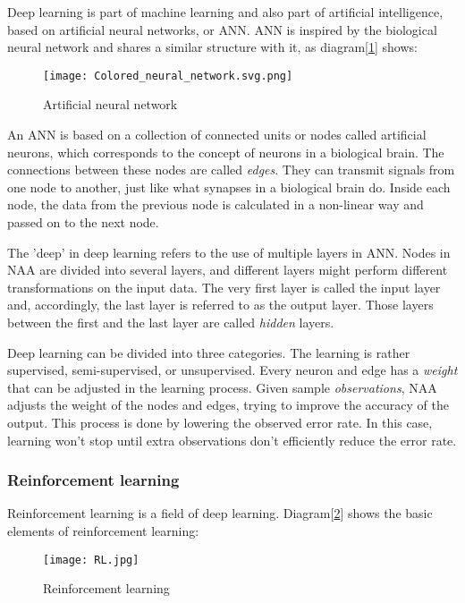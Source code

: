 \documentclass{mcmthesis}
\begin{document}
Deep learning is part of machine learning and also part of artificial intelligence,
based on artificial neural networks, or ANN.
ANN is inspired by the biological neural network
and shares a similar structure with it, as diagram[\ref{ANN}] shows:

\begin{figure}[h]
\small
\centering
\texttt{[image: Colored\_neural\_network.svg.png]}
\caption{Artificial neural network} \label{ANN}
\end{figure}

An ANN is based on a collection of connected units or nodes called artificial neurons,
which corresponds to the concept of neurons in a biological brain.
The connections between these nodes are called \textit{edges}.
They can transmit signals from one node to another,
just like what synapses in a biological brain do.
Inside each node, the data from the previous node is calculated in a non-linear way
and passed on to the next node.

The 'deep' in deep learning refers to the use of multiple layers in ANN.
Nodes in NAA are divided into several layers,
and different layers might perform different transformations on the input data.
The very first layer is called the input layer and,
accordingly, the last layer is referred to as the output layer.
Those layers between the first and the last layer are called \textit{hidden} layers.

Deep learning can be divided into three categories.
The learning is rather supervised, semi-supervised, or unsupervised.
Every neuron and edge has a \textit{weight} that can be adjusted in the learning process.
Given sample \textit{observations}, NAA adjusts the weight of the nodes and edges,
trying to improve the accuracy of the output.
This process is done by lowering the observed error rate.
In this case, learning won't stop until
extra observations don't efficiently reduce the error rate.

\subsubsection{Reinforcement learning}

 Reinforcement learning is a field of deep learning.
Diagram[\ref{LA}] shows the basic elements of reinforcement learning:

\begin{figure}[h]
  \small
  \centering
  \texttt{[image: RL.jpg]}
  \caption{Reinforcement learning} \label{LA}
\end{figure}
\end{document}
